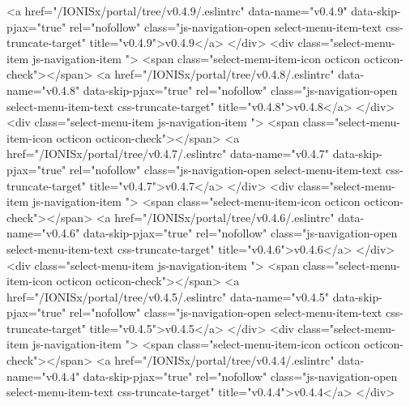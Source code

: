               <a href="/IONISx/portal/tree/v0.4.9/.eslintrc"
                 data-name="v0.4.9"
                 data-skip-pjax="true"
                 rel="nofollow"
                 class="js-navigation-open select-menu-item-text css-truncate-target"
                 title="v0.4.9">v0.4.9</a>
            </div>
            <div class="select-menu-item js-navigation-item ">
              <span class="select-menu-item-icon octicon octicon-check"></span>
              <a href="/IONISx/portal/tree/v0.4.8/.eslintrc"
                 data-name="v0.4.8"
                 data-skip-pjax="true"
                 rel="nofollow"
                 class="js-navigation-open select-menu-item-text css-truncate-target"
                 title="v0.4.8">v0.4.8</a>
            </div>
            <div class="select-menu-item js-navigation-item ">
              <span class="select-menu-item-icon octicon octicon-check"></span>
              <a href="/IONISx/portal/tree/v0.4.7/.eslintrc"
                 data-name="v0.4.7"
                 data-skip-pjax="true"
                 rel="nofollow"
                 class="js-navigation-open select-menu-item-text css-truncate-target"
                 title="v0.4.7">v0.4.7</a>
            </div>
            <div class="select-menu-item js-navigation-item ">
              <span class="select-menu-item-icon octicon octicon-check"></span>
              <a href="/IONISx/portal/tree/v0.4.6/.eslintrc"
                 data-name="v0.4.6"
                 data-skip-pjax="true"
                 rel="nofollow"
                 class="js-navigation-open select-menu-item-text css-truncate-target"
                 title="v0.4.6">v0.4.6</a>
            </div>
            <div class="select-menu-item js-navigation-item ">
              <span class="select-menu-item-icon octicon octicon-check"></span>
              <a href="/IONISx/portal/tree/v0.4.5/.eslintrc"
                 data-name="v0.4.5"
                 data-skip-pjax="true"
                 rel="nofollow"
                 class="js-navigation-open select-menu-item-text css-truncate-target"
                 title="v0.4.5">v0.4.5</a>
            </div>
            <div class="select-menu-item js-navigation-item ">
              <span class="select-menu-item-icon octicon octicon-check"></span>
              <a href="/IONISx/portal/tree/v0.4.4/.eslintrc"
                 data-name="v0.4.4"
                 data-skip-pjax="true"
                 rel="nofollow"
                 class="js-navigation-open select-menu-item-text css-truncate-target"
                 title="v0.4.4">v0.4.4</a>
            </div>
